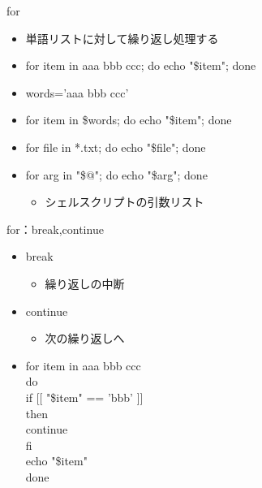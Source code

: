 \documentclass[12pt,aspectratio=169]{beamer}
\begin{document}
\begin{frame}{for}

  \begin{itemize}
    \item 単語リストに対して繰り返し処理する
    \item for item in aaa bbb ccc; do echo "\$item"; done
    \vspace{0.5cm}
    \item words='aaa bbb ccc'
    \item for item in \$words; do echo "\$item"; done
    \vspace{0.5cm}
    \item for file in *.txt; do echo "\$file"; done
    \vspace{0.5cm}
    \item for arg in "\$@"; do echo "\$arg"; done
    \begin{itemize}
      \item シェルスクリプトの引数リスト
    \end{itemize}
  \end{itemize}

\end{frame}

\begin{frame}{for：break,continue}

  \begin{itemize}
    \item break
    \begin{itemize}
      \item 繰り返しの中断
    \end{itemize}
    \item continue
    \begin{itemize}
      \item 次の繰り返しへ
    \end{itemize}
    \item for item in aaa bbb ccc \\ do \\ \hspace{0.5cm} if [[ "\$item" == 'bbb' ]] \\\hspace{0.5cm}  then \\ \hspace{1.0cm} continue \\ \hspace{0.5cm} fi \\ \hspace{0.5cm} echo "\$item" \\ done
  \end{itemize}

\end{frame}
\end{document}
